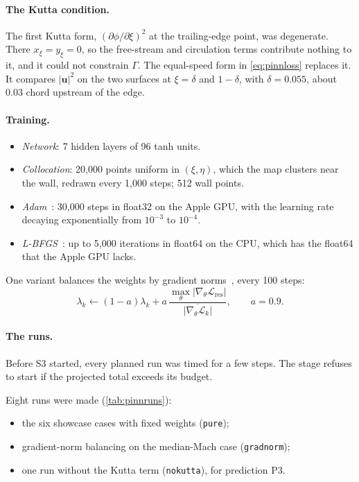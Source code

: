 \documentclass[11pt]{article}
\newcommand{\vu}{\bm{u}}
\begin{document}
\paragraph{The Kutta condition.}
The first Kutta form, $(\partial\phi/\partial\xi)^2$ at the trailing-edge point, was degenerate.
There $x_\xi = y_\xi = 0$, so the free-stream and circulation terms contribute nothing to it, and
it could not constrain $\Gamma$. The equal-speed form in \cref{eq:pinnloss} replaces it. It
compares $|\vu|^2$ on the two surfaces at $\xi = \delta$ and $1-\delta$, with $\delta = 0.055$,
about 0.03 chord upstream of the edge.

\paragraph{Training.}
\begin{itemize}
  \item \emph{Network}: 7 hidden layers of 96 tanh units.
  \item \emph{Collocation}: 20,000 points uniform in $(\xi,\eta)$, which the map clusters near the
    wall, redrawn every 1,000 steps; 512 wall points.
  \item \emph{Adam}~\cite{kingma2015adam}: 30,000 steps in float32 on the Apple GPU, with the
    learning rate decaying exponentially from $10^{-3}$ to $10^{-4}$.
  \item \emph{L-BFGS}~\cite{liu1989lbfgs}: up to 5,000 iterations in float64 on the CPU, which has
    the float64 that the Apple GPU lacks.
\end{itemize}
One variant balances the weights by gradient norms~\cite{wang2021gradient}, every 100 steps:
\begin{equation}
  \lambda_k \leftarrow (1-a)\lambda_k + a\,\frac{\max_\theta|\nabla_\theta\mathcal L_{\mathrm{res}}|}{\overline{|\nabla_\theta\mathcal L_k|}},\qquad a = 0.9 .
  \label{eq:gradnorm}
\end{equation}

\paragraph{The runs.}
Before S3 started, every planned run was timed for a few steps. The stage refuses to start if the
projected total exceeds its budget.

Eight runs were made (\cref{tab:pinnruns}):
\begin{itemize}
  \item the six showcase cases with fixed weights (\texttt{pure});
  \item gradient-norm balancing on the median-Mach case (\texttt{gradnorm});
  \item one run without the Kutta term (\texttt{nokutta}), for prediction P3.
\end{itemize}
\end{document}
